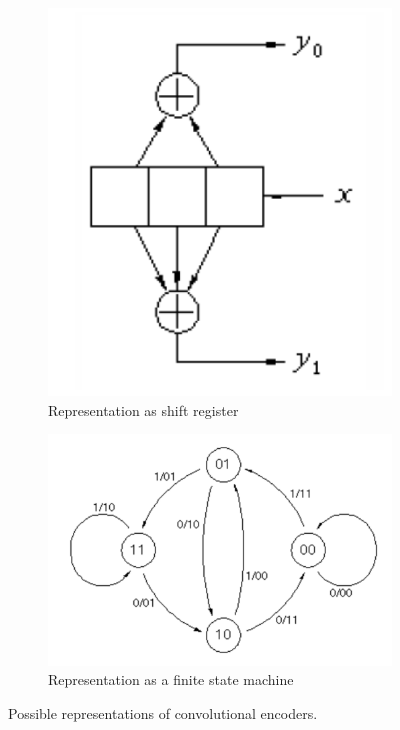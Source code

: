 \documentclass[12pt]{article}   	%
\begin{document}
\begin{figure}[htb]
    \centering
    \begin{subfigure}[t]{0.5\textwidth}
        \centering
        \includegraphics[height=0.7\textwidth]{img/conv_code_sh_reg}
        \caption{Representation as shift register}
        \label{fig:conv_code_sh_reg}
    \end{subfigure}%
    \begin{subfigure}[t]{0.5\textwidth}
        \centering
        \includegraphics[height=0.7\textwidth]{img/conv_code_fsm}
        \caption{Representation as a finite state machine}
        \label{fig:conv_code_fsm}
    \end{subfigure}
    \caption{Possible representations of convolutional encoders.}
    \label{fig:conv_code_reps}
\end{figure}
\end{document}
